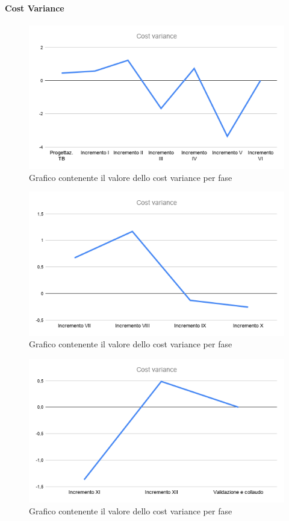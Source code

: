 	\paragraph{Cost Variance}
		\begin{figure}[H]
			\centering
			\includegraphics[width=0.8\linewidth]{./res/images/CV_1.png}
			\caption{Grafico contenente il valore dello cost variance per fase}
			\label{fig:Grafico contenente il valore dello cost variance per fase}
		\end{figure}
		\begin{figure}[H]
			\centering
			\includegraphics[width=0.8\linewidth]{./res/images/CV_2.png}
			\caption{Grafico contenente il valore dello cost variance per fase}
			\label{fig:Grafico contenente il valore dello cost variance per fase}
		\end{figure}
		\begin{figure}[H]
			\centering
			\includegraphics[width=0.8\linewidth]{./res/images/CV_3.png}
			\caption{Grafico contenente il valore dello cost variance per fase}
			\label{fig:Grafico contenente il valore dello cost variance per fase}
		\end{figure}

